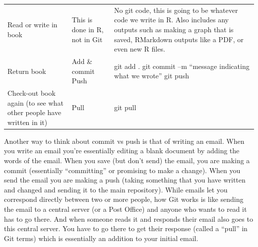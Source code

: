 \documentclass[
  12pt,
]{book}
\begin{document}
\begin{longtable}[]{@{}lll@{}}
\begin{minipage}[t]{0.30\columnwidth}\raggedright
Read or write in book\strut
\end{minipage} & \begin{minipage}[t]{0.30\columnwidth}\raggedright
This is done in R, not in Git\strut
\end{minipage} & \begin{minipage}[t]{0.30\columnwidth}\raggedright
No git code, this is going to be whatever code we write in R. Also includes any outputs such as making a graph that is saved, RMarkdown outputs like a PDF, or even new R files.\strut
\end{minipage}\tabularnewline
\begin{minipage}[t]{0.30\columnwidth}\raggedright
Return book\strut
\end{minipage} & \begin{minipage}[t]{0.30\columnwidth}\raggedright
Add \& commit Push\strut
\end{minipage} & \begin{minipage}[t]{0.30\columnwidth}\raggedright
git add . git commit --m ``message indicating what we wrote'' git push\strut
\end{minipage}\tabularnewline
\begin{minipage}[t]{0.30\columnwidth}\raggedright
Check-out book again (to see what other people have written in it)\strut
\end{minipage} & \begin{minipage}[t]{0.30\columnwidth}\raggedright
Pull\strut
\end{minipage} & \begin{minipage}[t]{0.30\columnwidth}\raggedright
git pull\strut
\end{minipage}\tabularnewline
\bottomrule
\end{longtable}

Another way to think about commit vs push is that of writing an email. When you write an email you're essentially editing a blank document by adding the words of the email. When you save (but don't send) the email, you are making a commit (essentially ``committing'' or promising to make a change). When you send the email you are making a push (taking something that you have written and changed and sending it to the main repository). While emails let you correspond directly between two or more people, how Git works is like sending the email to a central server (or a Post Office) and anyone who wants to read it has to go there. And when someone reads it and responds their email also goes to this central server. You have to go there to get their response (called a ``pull'' in Git terms) which is essentially an addition to your initial email.
\end{document}
